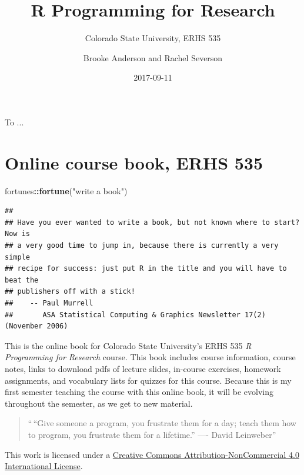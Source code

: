 \documentclass[]{book}
\title{R Programming for Research}
\subtitle{Colorado State University, ERHS 535}
\author{Brooke Anderson and Rachel Severson}
\date{2017-09-11}
\makeatletter
\newenvironment{Shaded}{\begin{snugshade}}{\end{snugshade}}
\newcommand{\KeywordTok}[1]{\textcolor[rgb]{0.13,0.29,0.53}{\textbf{#1}}}
\newcommand{\StringTok}[1]{\textcolor[rgb]{0.31,0.60,0.02}{#1}}
\newcommand{\OperatorTok}[1]{\textcolor[rgb]{0.81,0.36,0.00}{\textbf{#1}}}
\newcommand{\NormalTok}[1]{#1}
\newenvironment{kframe}{%
\medskip{}
\setlength{\fboxsep}{.8em}
 \def\at@end@of@kframe{}%
 \ifinner\ifhmode%
  \def\at@end@of@kframe{\end{minipage}}%
  \begin{minipage}{\columnwidth}%
 \fi\fi%
 \def\FrameCommand##1{\hskip\@totalleftmargin \hskip-\fboxsep
 \colorbox{shadecolor}{##1}\hskip-\fboxsep
     \hskip-\linewidth \hskip-\@totalleftmargin \hskip\columnwidth}%
 \MakeFramed {\advance\hsize-\width
   \@totalleftmargin\z@ \linewidth\hsize
   \@setminipage}}%
 {\par\unskip\endMakeFramed%
 \at@end@of@kframe}
\renewenvironment{Shaded}{\begin{kframe}}{\end{kframe}}
\theoremstyle{definition}
\theoremstyle{definition}
\theoremstyle{definition}
\theoremstyle{remark}
\makeatother
\begin{document}
\maketitle

\cleardoublepage\newpage\thispagestyle{empty}\null
\cleardoublepage\newpage\thispagestyle{empty}
\begin{center}
To ...
\end{center}

\frontmatter

{
\setcounter{tocdepth}{1}
\tableofcontents
}
\chapter*{Online course book, ERHS
535}\label{online-course-book-erhs-535}

\begin{Shaded}
\begin{Highlighting}[]
\NormalTok{fortunes}\OperatorTok{::}\KeywordTok{fortune}\NormalTok{(}\StringTok{"write a book"}\NormalTok{)}
\end{Highlighting}
\end{Shaded}

\begin{verbatim}
## 
## Have you ever wanted to write a book, but not known where to start? Now is
## a very good time to jump in, because there is currently a very simple
## recipe for success: just put R in the title and you will have to beat the
## publishers off with a stick!
##    -- Paul Murrell
##       ASA Statistical Computing & Graphics Newsletter 17(2) (November 2006)
\end{verbatim}

This is the online book for Colorado State University's ERHS 535 \emph{R
Programming for Research} course. This book includes course information,
course notes, links to download pdfs of lecture slides, in-course
exercises, homework assignments, and vocabulary lists for quizzes for
this course. Because this is my first semester teaching the course with
this online book, it will be evolving throughout the semester, as we get
to new material.

\begin{quote}
``\,``Give someone a program, you frustrate them for a day; teach them
how to program, you frustrate them for a lifetime.'' ---- David
Leinweber''
\end{quote}

This work is licensed under a
\href{https://creativecommons.org/licenses/by-nc/4.0/}{Creative Commons
Attribution-NonCommercial 4.0 International License}.
\end{document}
